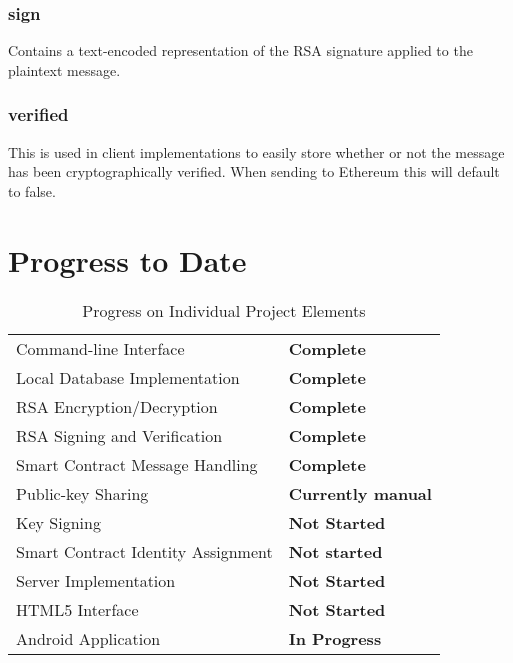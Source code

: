 \documentclass[titlepage]{report}
\begin{document}
\subsubsection{sign}
Contains a text-encoded representation of the RSA signature applied to the plaintext message.

\subsubsection{verified}
This is used in client implementations to easily store whether or not the message has been cryptographically verified. When sending to Ethereum this will default to false.

\pagebreak

\section{Progress to Date}

\begin{table}[ht]
\begin{center}
\caption{Progress on Individual Project Elements}
\begin{tabular}{ | l | p{5cm} |}
\hline
Command-line Interface & \textbf{Complete} \\
Local Database Implementation & \textbf{Complete} \\
RSA Encryption/Decryption & \textbf{Complete} \\
RSA Signing and Verification & \textbf{Complete} \\
Smart Contract Message Handling & \textbf{Complete} \\
\hline
Public-key Sharing & \textbf{Currently manual} \\
Key Signing & \textbf{Not Started} \\
\hline
Smart Contract Identity Assignment & \textbf{Not started} \\
Server Implementation & \textbf{Not Started} \\
HTML5 Interface & \textbf{Not Started} \\
Android Application & \textbf{In Progress} \\
\hline
\end{tabular}
\end{center}
\end{table}

\listoftables
\listoffigures
\printindex
\printglossaries{}
\printbibliography{}
\end{document}
